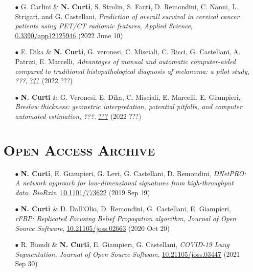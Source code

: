 \documentclass[a4paper,11pt]{article}
\begin{document}
\begin{itemize}
  \item[$\bullet$] G. Carlini \& \textbf{N. Curti}, S. Strolin, S. Fanti, D. Remondini, C. Nanni, L. Strigari, and G. Castellani, \emph{Prediction of overall survival in cervical cancer patients using PET/CT radiomic features}, \emph{Applied Science}, \url{0.3390/app12125946} (2022 June 10)

  \item[$\bullet$] E. Dika \& \textbf{N. Curti}, G. veronesi, C. Misciali, C. Ricci, G. Castellani, A. Patrizi, E. Marcelli, \emph{Advantages of manual and automatic computer-aided compared to traditional histopathological diagnosis of melanoma: a pilot study}, \emph{???}, \url{???} (2022 ???)

  \item[$\bullet$] \textbf{N. Curti} \& G. Veronesi, E. Dika, C. Misciali, E. Marcelli, E. Giampieri, \emph{Breslow thickness: geometric interpretation, potential pitfalls, and computer automated estimation}, \emph{???}, \url{???} (2022 ???)

\end{itemize}

\vspace*{0.5cm}
\section*{\scshape{Open Access Archive}}

\begin{itemize}

  \item[$\bullet$] \textbf{N. Curti}, E. Giampieri, G. Levi, G. Castellani, D. Remondini, \emph{DNetPRO: A network approach for low-dimensional signatures from high-throughput data}, \emph{BioRxiv}, \url{10.1101/773622} (2019 Sep 19)

  \item[$\bullet$] \textbf{N. Curti} \& D. Dall'Olio, D. Remondini, G. Castellani, E. Giampieri, \emph{rFBP: Replicated Focusing Belief Propagation algorithm}, \emph{Journal of Open Source Software}, \url{10.21105/joss.02663} (2020 Oct 20)

  \item[$\bullet$] R. Biondi \& \textbf{N. Curti}, E. Giampieri, G. Castellani, \emph{COVID-19 Lung Segmentation}, \emph{Journal of Open Source Software}, \url{10.21105/joss.03447} (2021 Sep 30)

\end{itemize}


\vspace*{0.5cm}
\end{document}
